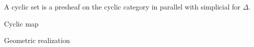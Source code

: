 \documentclass[../../main.tex]{subfiles}
\begin{document}
    A cyclic set is a presheaf on the cyclic category in parallel with  simplicial for $\Delta$. 
    
    Cyclic map
    
    Geometric realization
\end{document}
